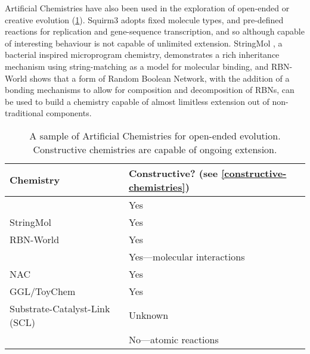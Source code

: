 Artificial Chemistries have also been used in the exploration of open-ended or creative evolution (\eg \cref{tab1}). Squirm3 \parencite{Hutton2002,Hutton2009} adopts fixed molecule types, and pre-defined reactions for replication and gene-sequence transcription, and so although capable of interesting behaviour is not capable of unlimited extension. StringMol \parencite{Hickinbotham2011}, a bacterial inspired microprogram chemistry, demonstrates a rich inheritance mechanism using string-matching as a model for molecular binding, and RBN-World \parencite{Faulconbridge2011} shows that a form of Random Boolean Network, with the addition of a bonding mechanisms to allow for composition and decomposition of RBNs, can be used to build a chemistry capable of almost limitless extension out of non-traditional components.

\begin{table}
	\scriptsize
	\begin{center}
	\caption{A sample of Artificial Chemistries for open-ended evolution. Constructive chemistries are capable of ongoing extension.}
	\label{tab1}
	\begin{tabular}{@{}p{7.5cm}p{6cm}@{}}
		\toprule
		Chemistry                                                          & Constructive? (see \cref{constructive-chemistries})\\ 
		\midrule
		\textcite{Ducharme2012}                                                & Yes                                      \\
		StringMol \parencite{Hickinbotham2012}                             & Yes                                      \\
		RBN-World \parencite{Faulconbridge2011}                            & Yes                                      \\
		\textcite{Lenaerts2009}                                                & Yes---molecular interactions             \\
		NAC \parencite{Suzuki2006}                                         & Yes                                      \\						
		GGL/ToyChem \parencite{Benko2005}                                  & Yes                                      \\
		\midrule
		Substrate-Catalyst-Link (SCL) \parencite{Varela:1974qd,Suzuki2008} & Unknown                                  \\
		\textcite{Fernando:2008xy,Fernando:2007pf}                             & No---atomic reactions                    \\

\end{tabular}
\end{center}
\end{table}
